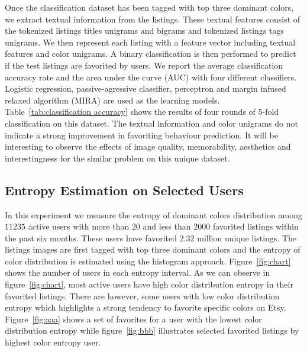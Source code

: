 \documentclass[conference,a4paper]{IEEEtran}
\begin{document}
Once the classification dataset has been tagged with top three
dominant colors, we extract textual information from the
listings. These textual features consist of the tokenized listings
titles unigrams and bigrams and tokenized listings
tags unigrams. We then represent each listing with a feature vector including textual features
and color unigrams. A binary classification is then performed to
predict if the test listings are favorited by
users. We report the average classification accuracy rate and the area
under the curve (AUC) with four different classifiers. Logistic
regression, passive-agressive classifier, perceptron and margin
infused relaxed algorithm (MIRA) are used as the learning models.
Table~\ref{tab:classification accuracy} shows the results
of four rounds of 5-fold classification on this dataset. 
The textual information and color unigrams do not indicate a strong
improvement in favoriting behaviour prediction. It will be interesting
to observe the effects of image quality, memorability, aesthetics and
interestingness for the similar problem on this unique dataset.

\subsection{Entropy Estimation on Selected Users}
\label{sec:entropy}
         

In this experiment we measure the entropy of dominant colors
distribution among
$11235$ active users with more
than $20$ and less than $2000$ favorited listings within the past six
months. These users have favorited $2.32$ million unique
listings. The listings images are first tagged with top three dominant
colors and the entropy of color distribution is estimated using the
histogram approach. Figure~\ref{fig:chart} shows the number of users
in each entropy interval. As we can observe in figure~\ref{fig:chart},
most active users have high color distribution entropy in their
favorited listings. There are however, some users with low color
distribution entropy which highlights a strong tendency to favorite
specific colors on Etsy. Figure~\ref{fig:aaa} shows a set of favorites
for a user with the lowest color distribution entropy while
figure~\ref{fig:bbb} illustrates selected favorited listings by
highest color entropy user.
\end{document}
